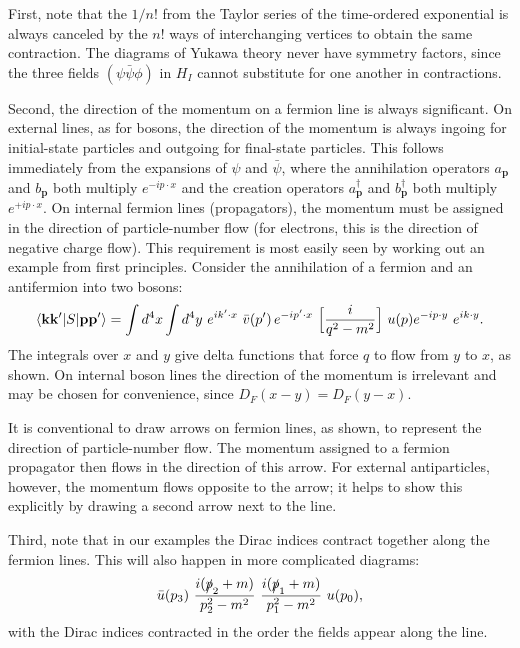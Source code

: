 First, note that the $1/n!$ from the Taylor series of the time-ordered
exponential is always canceled by the $n!$ ways of interchanging vertices to
obtain the same contraction.  The diagrams of Yukawa theory never have
symmetry factors, since the three fields $(\psi\bar{\psi}\phi)$ in $H_I$
cannot substitute for one another in contractions.

Second, the direction of the momentum on a fermion line is always
significant.  On external lines, as for bosons, the direction of the momentum
is always ingoing for initial-state particles and outgoing for final-state
particles.  This follows immediately from the expansions of $\psi$ and
$\bar{\psi}$, where the annihilation operators $a_{\mathbf{p}}$ and
$b_{\mathbf{p}}$ both multiply $e^{-ip\cdot x}$ and the creation operators
$a_{\mathbf{p}}^\dagger$ and $b_{\mathbf{p}}^\dagger$ both multiply
$e^{+ip\cdot x}$.  On internal fermion lines (propagators), the momentum must
be assigned in the direction of particle-number flow (for electrons, this is
the direction of negative charge flow).  This requirement is most easily seen
by working out an example from first principles.  Consider the annihilation
of a fermion and an antifermion into two bosons:
\begin{equation}
  \langle \mathbf{k}\mathbf{k}'|S|\mathbf{p}\mathbf{p}'\rangle
    = \int d^4x\int d^4y\ e^{ik'\cdot x}\ \bar{v}(p')\,e^{-ip'\cdot x}\
      \Bigl[ \frac{i}{q^2-m^2} \Bigr]\ u(p)e^{-ip\cdot y}\ e^{ik\cdot y} .
  \label{eq:4.118}
\end{equation}
The integrals over $x$ and $y$ give delta functions that force $q$ to flow
from $y$ to $x$, as shown.  On internal boson lines the direction of the
momentum is irrelevant and may be chosen for convenience, since
$D_F(x-y) = D_F(y-x)$.

It is conventional to draw arrows on fermion lines, as shown, to represent the
direction of particle-number flow.  The momentum assigned to a fermion
propagator then flows in the direction of this arrow.  For external
antiparticles, however, the momentum flows opposite to the arrow; it helps to
show this explicitly by drawing a second arrow next to the line.

Third, note that in our examples the Dirac indices contract together along
the fermion lines.  This will also happen in more complicated diagrams:
\begin{equation}
  \bar{u}(p_3)\ \frac{i(\slashed{p}_2+m)}{p_2^2-m^2}\
    \frac{i(\slashed{p}_1+m)}{p_1^2-m^2}\ u(p_0) ,
  \label{eq:4.119}
\end{equation}
with the Dirac indices contracted in the order the fields appear along the
line.

